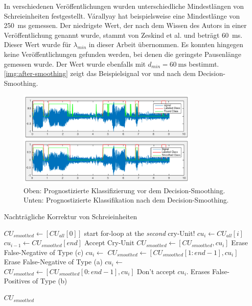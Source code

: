 In verschiedenen Veröffentlichungen wurden unterschiedliche Mindestlängen von Schreieinheiten festgestellt. Várallyay \cite[S. 8]{cry_thesis} hat beispielsweise eine Mindestlänge von \SI{250}{\milli\second} gemessen. Der niedrigste Wert, der nach dem Wissen des Autors in einer Veröffentlichung genannt wurde, stammt von Zeskind et al. \cite[S. 325]{rythmic} und beträgt  \SI{60}{\milli\second}. Dieser Wert wurde für $\lambda_{min}$ in dieser Arbeit übernommen. Es konnten hingegen keine Veröffentlichungen gefunden werden, bei denen die geringste Pausenlänge gemessen wurde. Der Wert wurde ebenfalls mit $d_{min} = \SI{60}{\milli\second}$ bestimmt. \autoref{img:after-smoothing} zeigt das Beispielsignal vor und nach dem Decision-Smoothing. 

\begin{figure}[h]
	\centering
	\includegraphics[width=0.8\textwidth]{bilder/smoothing04.png}
	\caption[Klassifizierung nach dem Decision-Smoothing]{Oben: Prognostizierte Klassifizierung vor dem Decision-Smoothing. Unten: Prognostizierte Klassifikation nach dem Decision-Smoothing.}
	\label{img:after-smoothing}
\end{figure}

\begin{algorithm}[h]
	\caption{Nachträgliche Korrektur von Schreieinheiten}
	\label{alg:decisionSmoothing}
	\begin{algorithmic}[1]
		\State $CU_{smoothed} \gets[CU_{all}[0]] $
		\State \Comment start for-loop at the \emph{second} cry-Unit!
			\State $cu_i \gets CU_{all}[i]$
			\State $cu_{i-1} \gets CU_{smoothed}[end]$
			\State \Comment Accept Cry-Unit
					\State $CU_{smoothed} \gets [CU_{smoothed}, cu_i] $
			\Else
					\State \Comment Erase False-Negative of Type (c)
					\State $cu_i \gets $ 
					\State $CU_{smoothed} \gets [CU_{smoothed}[1:end-1], cu_i] $
			\EndIf
			\Else
			\State \Comment Erase False-Negative of Type (a)
			\State $cu_i \gets $ 
			\State $CU_{smoothed} \gets [CU_{smoothed}[0:end-1], cu_i] $
			\Else
			\State \Comment Don't accept $cu_i$. Erases False-Positives of Type (b)
			\EndIf
			\EndIf
		\EndFor
		
		\Return $CU_{smoothed}$
		\EndFunction
		
	\end{algorithmic}
\end{algorithm}




